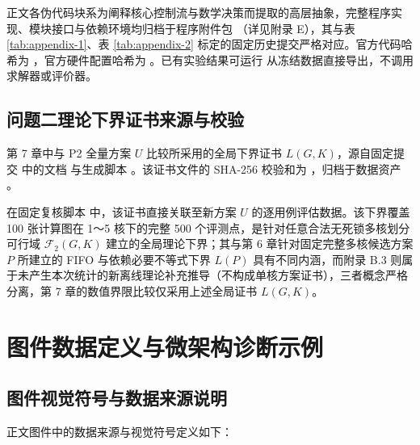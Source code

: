 \documentclass[anonymous,withtoc]{gmcm2026}
\begin{document}
正文各伪代码块系为阐释核心控制流与数学决策而提取的高层抽象，完整程序实现、模块接口与依赖环境均归档于程序附件包 \texttt{}（详见附录 E），其与表 \ref{tab:appendix-1}、表 \ref{tab:appendix-2} 标定的固定历史提交严格对应。官方代码哈希为 \texttt{}，官方硬件配置哈希为 \texttt{}。已有实验结果可运行 \texttt{} 从冻结数据直接导出，不调用求解器或评价器。

\subsection{问题二理论下界证书来源与校验}

第 7 章中与 P2 全量方案 \(U\) 比较所采用的全局下界证书 \(L(G, K)\)，源自固定提交 \texttt{} 中的文档 \texttt{} 与生成脚本 \texttt{}。该证书文件的 SHA-256 校验和为 \texttt{}，归档于数据资产 \texttt{}。

在固定复核脚本 \texttt{} 中，该证书直接关联至新方案 \(U\) 的逐用例评估数据。该下界覆盖 100 张计算图在 1～5 核下的完整 500 个评测点，是针对任意合法无死锁多核划分可行域 \(\mathcal{F}_2(G, K)\) 建立的全局理论下界；其与第 6 章针对固定完整多核候选方案 \(P\) 所建立的 FIFO 与依赖必要不等式下界 \(L(P)\) 具有不同内涵，而附录 B.3 则属于未产生本次统计的新离线理论补充推导（不构成单核方案证书），三者概念严格分离，第 7 章的数值界限比较仅采用上述全局证书 \(L(G, K)\)。

\section{图件数据定义与微架构诊断示例}

\subsection{图件视觉符号与数据来源说明}

正文图件中的数据来源与视觉符号定义如下：
\end{document}
